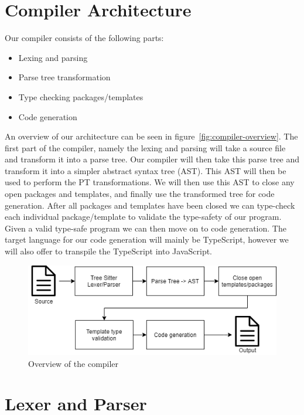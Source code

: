 \section{Compiler Architecture}\label{sec:architecture}

Our compiler consists of the following parts:

\begin{itemize}
    \item Lexing and parsing
    \item Parse tree transformation
    \item Type checking packages/templates
    \item Code generation
\end{itemize}

An overview of our architecture can be seen in figure~\vref{fig:compiler-overview}.
The first part of the compiler, namely the lexing and parsing will take a source file and transform it into a parse tree.
Our compiler will then take this parse tree and transform it into a simpler abstract syntax tree (AST).
This AST will then be used to perform the PT transformations.
We will then use this AST to close any open packages and templates, and finally use the transformed tree for code generation.
After all packages and templates have been closed we can type-check each individual package/template to validate the type-safety of our program.
Given a valid type-safe program we can then move on to code generation.
The target language for our code generation will mainly be TypeScript, however we will also offer to transpile the TypeScript into JavaScript.

\begin{figure}
   \centering
   \includegraphics[scale=.75]{images/Compiler overview.png}
   \caption{Overview of the compiler}
   \label{fig:compiler-overview}
\end{figure}

\section{Lexer and Parser}\label{sec:lexer-and-parser}


